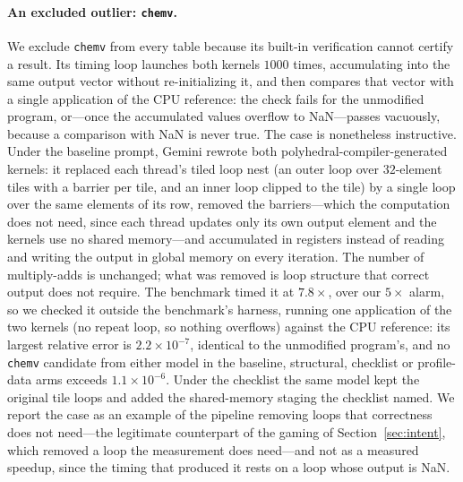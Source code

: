 \paragraph{An excluded outlier: \texttt{chemv}.}
We exclude \texttt{chemv} from every table because its built-in verification cannot certify a result.
Its timing loop launches both kernels $1000$ times, accumulating into the same output vector without
re-initializing it, and then compares that vector with a single application of the CPU reference: the
check fails for the unmodified program, or---once the accumulated values overflow to NaN---passes
vacuously, because a comparison with NaN is never true. The case is nonetheless instructive. Under the
baseline prompt, Gemini rewrote both polyhedral-compiler-generated kernels: it replaced each thread's
tiled loop nest (an outer loop over $32$-element tiles with a barrier per tile, and an inner loop
clipped to the tile) by a single loop over the same elements of its row, removed the barriers---which
the computation does not need, since each thread updates only its own output element and the kernels
use no shared memory---and accumulated in registers instead of reading and writing the output in global
memory on every iteration. The number of multiply-adds is unchanged; what was removed is loop structure
that correct output does not require. The benchmark timed it at $7.8\times$, over our $5\times$ alarm,
so we checked it outside the benchmark's harness, running one application of the two kernels (no
repeat loop, so nothing overflows) against the CPU reference: its largest relative error is
$2.2\times10^{-7}$, identical to the unmodified program's, and no \texttt{chemv} candidate from either
model in the baseline, structural, checklist or profile-data arms exceeds $1.1\times10^{-6}$. Under the checklist the same model kept the original tile
loops and added the shared-memory staging the checklist named. We report the case as an example of the
pipeline removing loops that correctness does not need---the legitimate counterpart of the gaming of
Section~\ref{sec:intent}, which removed a loop the measurement does need---and not as a measured
speedup, since the timing that produced it rests on a loop whose output is NaN.

